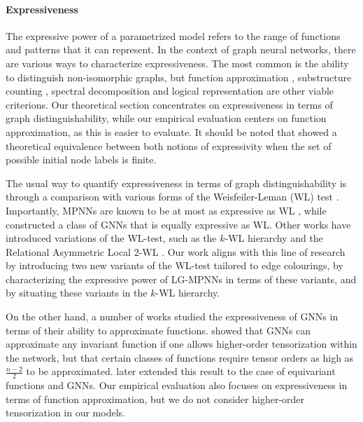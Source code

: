 \documentclass{article}
\begin{document}
\paragraph{Expressiveness}
The expressive power of a parametrized model refers to the range of functions and patterns that it can represent. 
In the context of graph neural networks, there are various ways to characterize expressiveness. The most common is the ability to distinguish non-isomorphic graphs, but function approximation \cite{maron2019universality}, substructure counting \cite{chen2020can}, spectral decomposition \cite{balcilar2020analyzing} and logical representation \cite{barcelo2020logical} are other viable criterions. Our theoretical section concentrates on expressiveness in terms of graph distinguishability, while our empirical evaluation centers on function approximation, as this is easier to evaluate. It should be noted that \cite{chen2019equivalence} showed a theoretical equivalence between both notions of expressivity when the set of possible initial node labels is finite.

The usual way to quantify expressiveness in terms of graph distinguishability is through a comparison with various forms of the Weisfeiler-Leman (WL) test \cite{weisfeiler1968reduction}. Importantly, MPNNs are known to be at most as expressive as WL \cite{morris2019weisfeiler}, while \cite{xu2018powerful} constructed a class of GNNs that is equally expressive as WL. Other works have introduced variations of the WL-test, such as the $k$-WL hierarchy \cite{immerman1990describing} and the Relational Asymmetric Local 2-WL \cite{huang2024theory}.
Our work aligns with this line of research by introducing two new variants of the WL-test tailored to edge colourings, by characterizing the expressive power of LG-MPNNs in terms of these variants, and by situating these variants in the $k$-WL hierarchy.

On the other hand, a number of works studied the expressiveness of GNNs in terms of their ability to approximate functions. \cite{maron2019universality} showed that GNNs can approximate any invariant function if one allows higher-order tensorization within the network, but that certain classes of functions require tensor orders as high as $\frac{n-2}{2}$ to be approximated. \cite{keriven2019universal} later extended this result to the case of equivariant functions and GNNs.
Our empirical evaluation also focuses on expressiveness in terms of function approximation, but we do not consider higher-order tensorization in our models.
\end{document}
